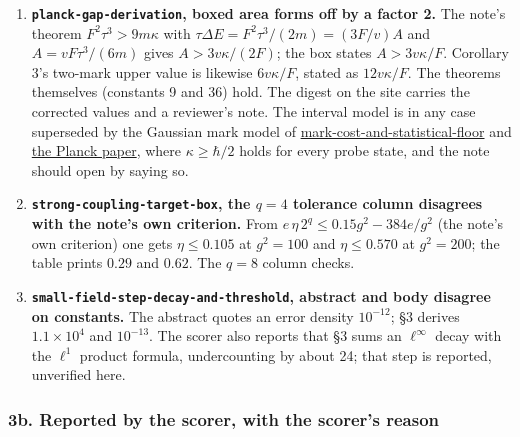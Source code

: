 \documentclass[11pt,a4paper]{article}
\begin{document}
\begin{enumerate}
\def\labelenumi{(\alph{enumi})}
\item
  \textbf{\texttt{planck-gap-derivation}, boxed area forms off by a
  factor 2.} The note's theorem \(F^2\tau^3>9m\kappa\) with
  \(\tau\Delta E=F^2\tau^3/(2m)=(3F/v)A\) and \(A=vF\tau^3/(6m)\) gives
  \(A>3v\kappa/(2F)\); the box states \(A>3v\kappa/F\). Corollary 3's
  two-mark upper value is likewise \(6v\kappa/F\), stated as
  \(12v\kappa/F\). The theorems themselves (constants 9 and 36) hold.
  The digest on the site carries the corrected values and a reviewer's
  note. The interval model is in any case superseded by the Gaussian
  mark model of
  \href{mark-cost-and-statistical-floor.md}{mark-cost-and-statistical-floor}
  and \href{planck-gap-paper.md}{the Planck paper}, where
  \(\kappa\ge\hbar/2\) holds for every probe state, and the note should
  open by saying so.
\item
  \textbf{\texttt{strong-coupling-target-box}, the \(q=4\) tolerance
  column disagrees with the note's own criterion.} From
  \(e\,\eta\,2^q\le0.15g^2-384e/g^2\) (the note's own criterion) one
  gets \(\eta\le0.105\) at \(g^2=100\) and \(\eta\le0.570\) at
  \(g^2=200\); the table prints \(0.29\) and \(0.62\). The \(q=8\)
  column checks.
\item
  \textbf{\texttt{small-field-step-decay-and-threshold}, abstract and
  body disagree on constants.} The abstract quotes an error density
  \(10^{-12}\); §3 derives \(1.1\times10^4\) and \(10^{-13}\). The
  scorer also reports that §3 sums an \(\ell^\infty\) decay with the
  \(\ell^1\) product formula, undercounting by about 24; that step is
  reported, unverified here.
\end{enumerate}

\hypertarget{b.-reported-by-the-scorer-with-the-scorers-reason}{%
\subsubsection{3b. Reported by the scorer, with the scorer's
reason}\label{b.-reported-by-the-scorer-with-the-scorers-reason}}
\end{document}
